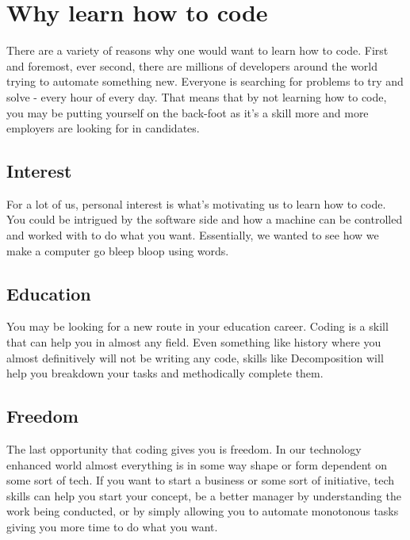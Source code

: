 \documentclass[12pt,a4paper]{book}
\begin{document}
	\chapter{Why learn how to code}  \label{chap:why-code}
		There are a variety of reasons why one would want to learn how to code. First and foremost, ever second, there are millions of developers around the world trying to automate something new. Everyone is searching for problems to try and solve - every hour of every day. That means that by not learning how to code, you may be putting yourself on the back-foot as it's a skill more and more employers are looking for in candidates.
		\section{Interest}
			For a lot of us, personal interest is what's motivating us to learn how to code. You could be intrigued by the software side and how a machine can be controlled and worked with to do what you want. Essentially, we wanted to see how we make a computer go bleep bloop using words.
		\section{Education}
			You may be looking for a new route in your education career. Coding is a skill that can help you in almost any field. Even something like history where you almost definitively will not be writing any code, skills like Decomposition will help you breakdown your tasks and methodically complete them. 
		\section{Freedom}
			The last opportunity that coding gives you is freedom. In our technology enhanced world almost everything is in some way shape or form dependent on some sort of tech. If you want to start a business or some sort of initiative, tech skills can help you start your concept, be a better manager by understanding the work being conducted, or by simply allowing you to automate monotonous tasks giving you more time to do what you want. 
\end{document}
